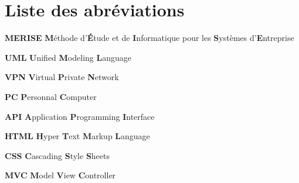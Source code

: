 \chapter*{Liste des abréviations}


\begin{flushleft}
	\textbf{MERISE}   \textbf{M}éthode d'\textbf{É}tude et de \textbf{I}nformatique pour les \textbf{S}ystèmes d'\textbf{E}ntreprise\\
\end{flushleft}

\begin{flushleft}
	\textbf{UML}  \textbf{U}nified \textbf{M}odeling \textbf{L}anguage
\end{flushleft}

\begin{flushleft}
	\textbf{VPN}  \textbf{V}irtual \textbf{P}rivate \textbf{N}etwork
\end{flushleft}

\begin{flushleft}
	\textbf{PC}  \textbf{P}ersonnal \textbf{C}omputer
\end{flushleft}

\begin{flushleft}
	\textbf{API}  \textbf{A}pplication \textbf{P}rogramming \textbf{I}nterface
\end{flushleft}

\begin{flushleft}
	\textbf{HTML}  \textbf{H}yper \textbf{T}ext \textbf{M}arkup \textbf{L}anguage
\end{flushleft}

\begin{flushleft}
	\textbf{CSS}  \textbf{C}ascading \textbf{S}tyle \textbf{S}heets
\end{flushleft}

\begin{flushleft}
	\textbf{MVC}  \textbf{M}odel \textbf{V}iew \textbf{C}ontroller
\end{flushleft}